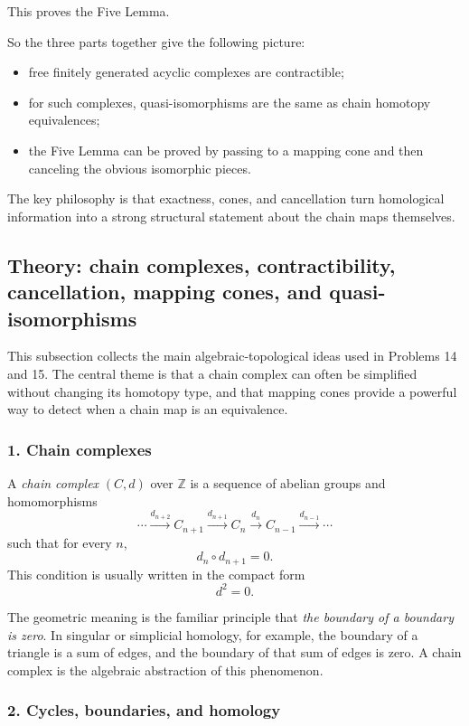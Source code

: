 \documentclass[12pt,a4paper]{article}
\theoremstyle{notespace}
\begin{document}
This proves the Five Lemma.

\medskip

So the three parts together give the following picture:

\begin{itemize}
	\item free finitely generated acyclic complexes are contractible;
	\item for such complexes, quasi-isomorphisms are the same as chain homotopy equivalences;
	\item the Five Lemma can be proved by passing to a mapping cone and then canceling the obvious isomorphic pieces.
\end{itemize}

The key philosophy is that exactness, cones, and cancellation turn homological information into a strong structural statement about the chain maps themselves.

\subsection{Theory: chain complexes, contractibility, cancellation, mapping cones, and quasi-isomorphisms}

This subsection collects the main algebraic-topological ideas used in Problems 14 and 15. The central theme is that a chain complex can often be simplified without changing its homotopy type, and that mapping cones provide a powerful way to detect when a chain map is an equivalence.

\subsubsection*{1. Chain complexes}

A \emph{chain complex} \((C,d)\) over \(\mathbb Z\) is a sequence of abelian groups and homomorphisms
\[
\cdots \xrightarrow{d_{n+2}} C_{n+1}\xrightarrow{d_{n+1}} C_n\xrightarrow{d_n} C_{n-1}\xrightarrow{d_{n-1}} \cdots
\]
such that for every \(n\),
\[
d_n\circ d_{n+1}=0.
\]
This condition is usually written in the compact form
\[
d^2=0.
\]

The geometric meaning is the familiar principle that \emph{the boundary of a boundary is zero}. In singular or simplicial homology, for example, the boundary of a triangle is a sum of edges, and the boundary of that sum of edges is zero. A chain complex is the algebraic abstraction of this phenomenon.

\subsubsection*{2. Cycles, boundaries, and homology}
\end{document}
